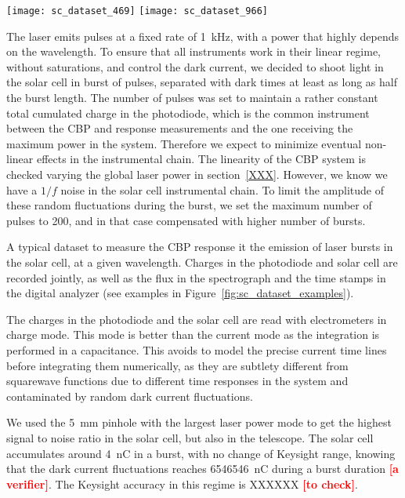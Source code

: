 \documentclass[printer]{aa}
\newcommand{\todo}[1]{\textbf{\textcolor{red}{[#1]}}\xspace}
\begin{document}
\begin{figure*}[!h]
\centering
\texttt{[image: sc\_dataset\_469]}
\texttt{[image: sc\_dataset\_966]}
\caption{From top to bottom: typical data sets for digital analyzer (pin state 4 is the Keithley output, pin state 2 the laser trigger output, pin state 1 the Keysight start and end time acquisition time stamps), charges in the photodiode, charges in the solar cell, flux in the spectrograph. Left: typical data set at \SI{469}{\nm}. Right: typical data set at \SI{966}{\nm}.}\label{fig:sc_dataset_examples}
\end{figure*}

The laser emits pulses at a fixed rate of \SI{1}{\kilo\hertz}, with a power that highly depends on the wavelength. To ensure that all instruments work in their linear regime, without saturations, and control the dark current, we decided to shoot light in the solar cell in burst of pulses, separated with dark times at least as long as half the burst length. The number of pulses was set to maintain a rather constant total cumulated charge in the photodiode, which is the common instrument between the CBP and \SD response measurements and the one receiving the maximum power in the system. Therefore we expect to minimize eventual non-linear effects in the instrumental chain. The linearity of the CBP system is checked varying the global laser power in section~\ref{XXX}. However, we know we have a $1/f$ noise in the solar cell instrumental chain. To limit the amplitude of these random fluctuations during the burst, we set the maximum number of pulses to 200, and in that case compensated with higher number of bursts.

A typical dataset to measure the CBP response it the emission of laser bursts in the solar cell, at a given wavelength. Charges in the photodiode and solar cell are recorded jointly, as well as the flux in the spectrograph and the time stamps in the digital analyzer (see examples in Figure~\ref{fig:sc_dataset_examples}).

The charges in the photodiode and the solar cell are read with electrometers in charge mode. This mode is better than the current mode as the integration is performed in a capacitance. This avoids to model the precise current time lines before integrating them numerically, as they are subtlety different from squarewave functions due to different time responses in the system and contaminated by random dark current fluctuations. 

We used the \SI{5}{\mm} pinhole with the largest laser power mode to get the highest signal to noise ratio in the solar cell, but also in the \SD telescope. The solar cell accumulates around \SI{4}{\nano\coulomb} in a burst, with no change of Keysight range, knowing that the dark current fluctuations reaches \SI{6546546}{\nano\coulomb} during a burst duration \todo{a verifier}. The Keysight accuracy in this regime is XXXXXX \todo{to check}. 
\end{document}
